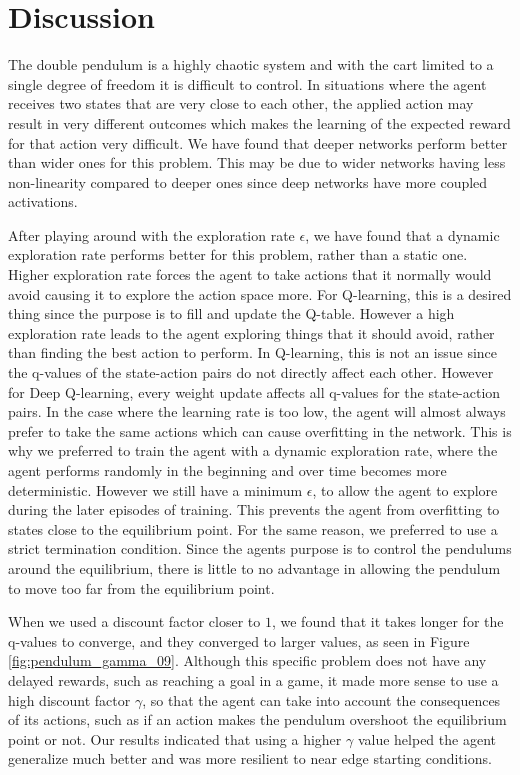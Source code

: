 \documentclass{LTHtwocol} %
\begin{document}
\section{Discussion}
The double pendulum is a highly chaotic system and with the cart limited to a single degree of freedom it is difficult to control.
In situations where the agent receives two states that are very close to each other, the applied action may result in very different outcomes which makes the learning of the expected reward for that action very difficult.
We have found that deeper networks perform better than wider ones for this problem.
This may be due to wider networks having less non-linearity compared to deeper ones since deep networks have more coupled activations.

After playing around with the exploration rate $\epsilon$, we have found that a dynamic exploration rate performs better for this problem, rather than a static one.
Higher exploration rate forces the agent to take actions that it normally would avoid causing it to explore the action space more.
For Q-learning, this is a desired thing since the purpose is to fill and update the Q-table.
However a high exploration rate leads to the agent exploring things that it should avoid, rather than finding the best action to perform.
In Q-learning, this is not an issue since the q-values of the state-action pairs do not directly affect each other.
However for Deep Q-learning, every weight update affects all q-values for the state-action pairs.
In the case where the learning rate is too low, the agent will almost always prefer to take the same actions which can cause overfitting in the network.
This is why we preferred to train the agent with a dynamic exploration rate, where the agent performs randomly in the beginning and over time becomes more deterministic.
However we still have a minimum $\epsilon$, to allow the agent to explore during the later episodes of training.
This prevents the agent from overfitting to states close to the equilibrium point.
For the same reason, we preferred to use a strict termination condition. 
Since the agents purpose is to control the pendulums around the equilibrium, there is little to no advantage in allowing the pendulum to move too far from the equilibrium point.

When we used a discount factor closer to $1$, we found that it takes longer for the q-values to converge, and they converged to larger values, as seen in Figure \ref{fig:pendulum_gamma_09}.
Although this specific problem does not have any delayed rewards, such as reaching a goal in a game, it made more sense to use a high discount factor $\gamma$, so that the agent can take into account the consequences of its actions, such as if an action makes the pendulum overshoot the equilibrium point or not.
Our results indicated that using a higher $\gamma$ value helped the agent generalize much better and was more resilient to near edge starting conditions.
\end{document}
